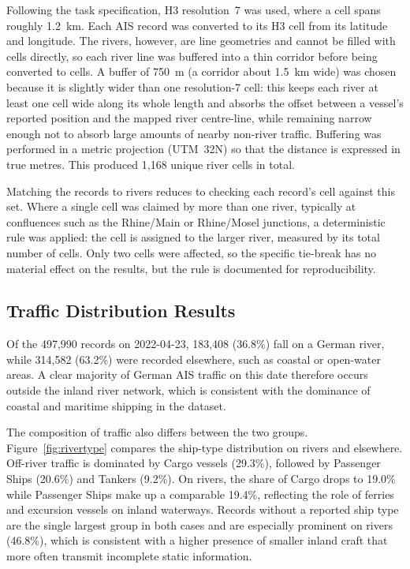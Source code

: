 \documentclass[10pt,a4paper]{article}
\begin{document}
Following the task specification, H3 resolution~7 was used, where a cell spans
roughly 1.2~km. Each AIS record was converted to its H3 cell from its latitude and
longitude. The rivers, however, are line geometries and cannot be filled with cells
directly, so each river line was buffered into a thin corridor before being converted
to cells. A buffer of 750~m (a corridor about 1.5~km wide) was chosen because it is
slightly wider than one resolution-7 cell: this keeps each river at least one cell
wide along its whole length and absorbs the offset between a vessel's reported
position and the mapped river centre-line, while remaining narrow enough not to
absorb large amounts of nearby non-river traffic. Buffering was performed in a metric
projection (UTM~32N) so that the distance is expressed in true metres. This produced
1,168 unique river cells in total.

Matching the records to rivers reduces to checking each record's cell against this
set. Where a single cell was claimed by more than one river, typically at confluences
such as the Rhine/Main or Rhine/Mosel junctions, a deterministic rule was applied:
the cell is assigned to the larger river, measured by its total number of cells. Only
two cells were affected, so the specific tie-break has no material effect on the
results, but the rule is documented for reproducibility.


\subsection{Traffic Distribution Results}

Of the 497,990 records on 2022-04-23, 183,408 (36.8\%) fall on a German river, while
314,582 (63.2\%) were recorded elsewhere, such as coastal or open-water areas. A clear
majority of German AIS traffic on this date therefore occurs outside the inland river
network, which is consistent with the dominance of coastal and maritime shipping in
the dataset.

The composition of traffic also differs between the two groups. Figure~\ref{fig:rivertype}
compares the ship-type distribution on rivers and elsewhere. Off-river traffic is
dominated by Cargo vessels (29.3\%), followed by Passenger Ships (20.6\%) and Tankers
(9.2\%). On rivers, the share of Cargo drops to 19.0\% while Passenger Ships make up a
comparable 19.4\%, reflecting the role of ferries and excursion vessels on inland
waterways. Records without a reported ship type are the single largest group in both
cases and are especially prominent on rivers (46.8\%), which is consistent with a
higher presence of smaller inland craft that more often transmit incomplete static
information.
\end{document}

